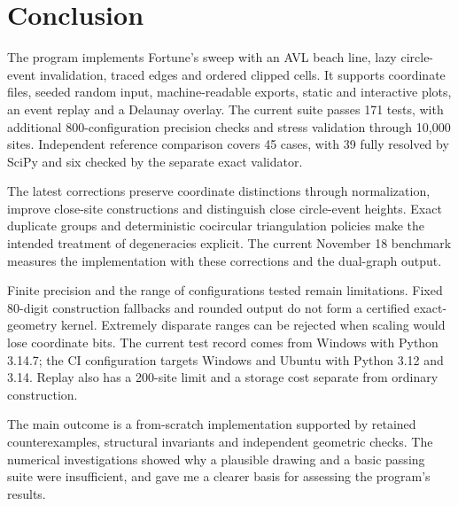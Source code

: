 \section{Conclusion}
\label{sec:9}

The program implements Fortune's sweep with an AVL beach line, lazy circle-event invalidation, traced edges and ordered clipped cells. It supports coordinate files, seeded random input, machine-readable exports, static and interactive plots, an event replay and a Delaunay overlay. The current suite passes 171 tests, with additional 800-configuration precision checks and stress validation through 10,000 sites. Independent reference comparison covers 45 cases, with 39 fully resolved by SciPy and six checked by the separate exact validator.

The latest corrections preserve coordinate distinctions through normalization, improve close-site constructions and distinguish close circle-event heights. Exact duplicate groups and deterministic cocircular triangulation policies make the intended treatment of degeneracies explicit. The current November 18 benchmark measures the implementation with these corrections and the dual-graph output.

Finite precision and the range of configurations tested remain limitations. Fixed 80-digit construction fallbacks and rounded output do not form a certified exact-geometry kernel. Extremely disparate ranges can be rejected when scaling would lose coordinate bits. The current test record comes from Windows with Python 3.14.7; the CI configuration targets Windows and Ubuntu with Python 3.12 and 3.14. Replay also has a 200-site limit and a storage cost separate from ordinary construction.

The main outcome is a from-scratch implementation supported by retained counterexamples, structural invariants and independent geometric checks. The numerical investigations showed why a plausible drawing and a basic passing suite were insufficient, and gave me a clearer basis for assessing the program's results.
